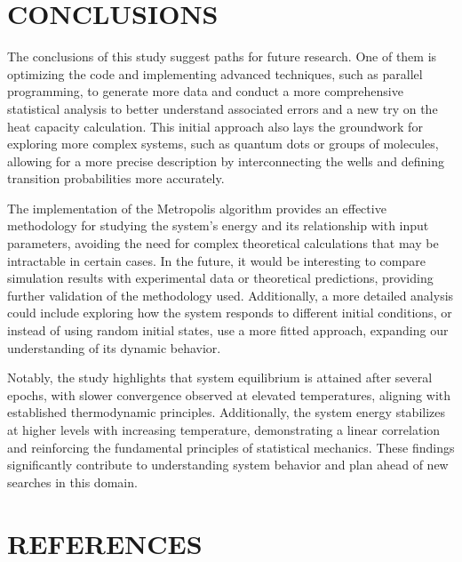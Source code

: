 \documentclass[%
 reprint,
 amsmath,amssymb,
 aps,
]{revtex4-2}
\begin{document}
\section{CONCLUSIONS}

The conclusions of this study suggest paths for future research. One of them is optimizing the code and implementing advanced techniques, such as parallel programming, to generate more data and conduct a more comprehensive statistical analysis to better understand associated errors and a new try on the heat capacity calculation. This initial approach also lays the groundwork for exploring more complex systems, such as quantum dots or groups of molecules, allowing for a more precise description by interconnecting the wells and defining transition probabilities more accurately.

The implementation of the Metropolis algorithm provides an effective methodology for studying the system's energy and its relationship with input parameters, avoiding the need for complex theoretical calculations that may be intractable in certain cases. In the future, it would be interesting to compare simulation results with experimental data or theoretical predictions, providing further validation of the methodology used. Additionally, a more detailed analysis could include exploring how the system responds to different initial conditions, or instead of using random initial states, use a more fitted approach, expanding our understanding of its dynamic behavior.

Notably, the study highlights that system equilibrium is attained after several epochs, with slower convergence observed at elevated temperatures, aligning with established thermodynamic principles. Additionally, the system energy stabilizes at higher levels with increasing temperature, demonstrating a linear correlation and reinforcing the fundamental principles of statistical mechanics. These findings significantly contribute to understanding system behavior and plan ahead of new searches in this domain.



\section{REFERENCES}
\nocite{*}
%
\end{document}
